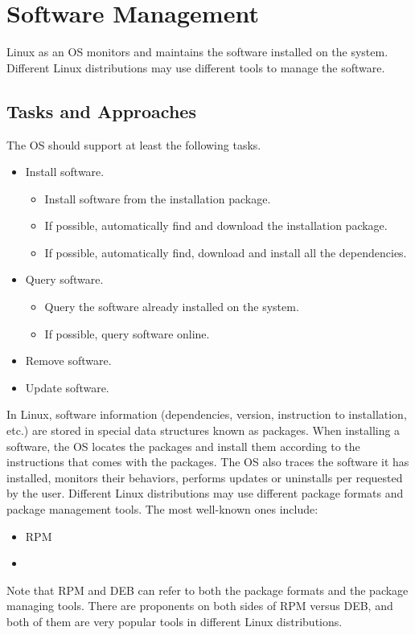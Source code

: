 \chapter{Software Management}

Linux as an OS monitors and maintains the software installed on the system. Different Linux distributions may use different tools to manage the software.

\section{Tasks and Approaches}

The OS should support at least the following tasks.
\begin{itemize}
	\item Install software.
		\begin{itemize}
			\item Install software from the installation package.
			\item If possible, automatically find and download the installation package.
			\item If possible, automatically find, download and install all the dependencies.
		\end{itemize}
	\item Query software.
		\begin{itemize}
			\item Query the software already installed on the system.
			\item If possible, query software online.
		\end{itemize}
	\item Remove software.
	\item Update software.
\end{itemize}

In Linux, software information (dependencies, version, instruction to installation, etc.) are stored in special data structures known as packages. When installing a software, the OS locates the packages and install them according to the instructions that comes with the packages. The OS also traces the software it has installed, monitors their behaviors, performs updates or uninstalls per requested by the user. Different Linux distributions may use different package formats and package management tools. The most well-known ones include:
\begin{itemize}
	\item RPM
	\item {}
\end{itemize}
Note that RPM and DEB can refer to both the package formats and the package managing tools. There are proponents on both sides of RPM versus DEB, and both of them are very popular tools in different Linux distributions.

